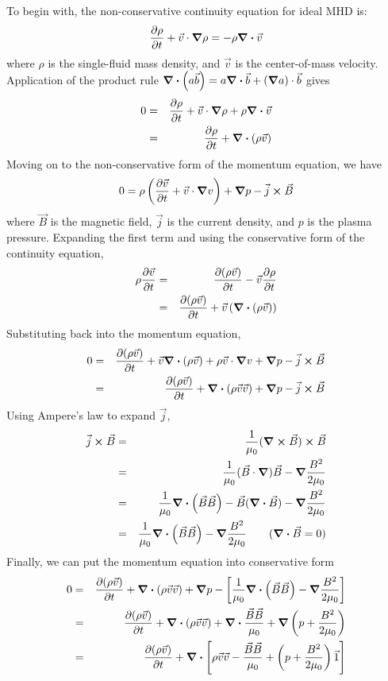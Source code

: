 \documentclass[%
 reprint,
 amsmath,amssymb,
 aps,
]{revtex4-2}
\begin{document}
To begin with, the non-conservative continuity equation for ideal MHD is:
\begin{equation}
\pdv{\rho}{t} + \vec v \cdot \grad \rho = - \rho \div \vec v
\end{equation}
where $\rho$ is the single-fluid mass density, and $\vec v$ is the center-of-mass velocity. Application of the product rule $\div (a \vec b) = a \div \vec b + (\grad a) \cdot \vec b$ gives
\begin{eqnarray}
0 & = & \pdv{\rho}{t} + \vec v \cdot \grad \rho + \rho \div \vec v \\
& = & \pdv{\rho}{t} + \div (\rho \vec v)
\end{eqnarray}
Moving on to the non-conservative form of the momentum equation, we have
\begin{equation}
0 = \rho \left( \pdv{\vec v}{t} + \vec v \cdot \grad v \right) + \grad p - \vec j \cross \vec B
\end{equation}
where $\vec B$ is the magnetic field, $\vec j$ is the current density, and $p$ is the plasma pressure. Expanding the first term and using the conservative form of the continuity equation,
\begin{eqnarray}
\rho \pdv{\vec v}{t} & = & \pdv{(\rho \vec v)}{t} - \vec v \pdv{\rho}{t} \\
& = & \pdv{(\rho \vec v)}{t} + \vec v \left( \div (\rho \vec v) \right)
\end{eqnarray}
Substituting back into the momentum equation,
\begin{eqnarray}
0 & = & \pdv{(\rho \vec v)}{t} + \vec v \div (\rho \vec v) + \rho \vec v \cdot \grad v + \grad p - \vec j \cross \vec B \\
& = & \pdv{(\rho \vec v)}{t} + \div (\rho \vec v \vec v) + \grad p - \vec j \cross \vec B
\end{eqnarray}
Using Ampere's law to expand $\vec j$,
\begin{eqnarray}
\vec j \cross \vec B & = & \frac{1}{\mu_0} (\curl \vec B) \cross \vec B \\
& = & \frac{1}{\mu_0} (\vec B \cdot \grad) \vec B -  \grad \frac{B^2}{2 \mu_0} \\
& = & \frac{1}{\mu_0} \div (\vec B \vec B) - \vec B (\div \vec B) - \grad \frac{B^2}{2 \mu_0} \\
& = & \frac{1}{\mu_0} \div (\vec B \vec B) - \grad \frac{B^2}{2 \mu_0} \qquad (\div \vec B = 0)
\end{eqnarray}
Finally, we can put the momentum equation into conservative form
\begin{eqnarray}
0 & = & \pdv{(\rho \vec v)}{t} + \div (\rho \vec v \vec v) + \grad p - \left[\frac{1}{\mu_0} \div (\vec B \vec B) - \grad \frac{B^2}{2 \mu_0} \right] \\
& = & \pdv{(\rho \vec v)}{t} + \div (\rho \vec v \vec v) + \div \frac{\vec B \vec B}{\mu_0} + \grad \left( p + \frac{B^2}{2 \mu_0} \right) \\
& = & \pdv{(\rho \vec v)}{t} + \div \left[ \rho \vec v \vec v - \frac{\vec B \vec B}{\mu_0} + \left( p + \frac{B^2}{2\mu_0} \right) \vec{1} \right]
\end{eqnarray}
\end{document}
